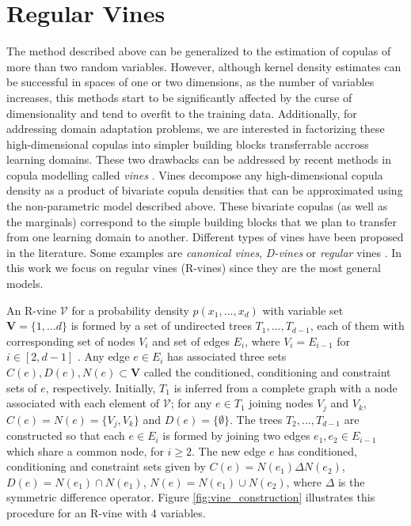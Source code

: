 \documentclass{article}
\begin{document}
\section{Regular Vines}\label{sec:vines}

The method described above can be generalized to the estimation of copulas of
more than two random variables.  However, although kernel density estimates can
be successful in spaces of one or two dimensions, as the number of variables
increases, this methods start to be significantly affected by the curse of
dimensionality and tend to overfit to the training data. Additionally, for
addressing domain adaptation problems, we are interested in factorizing these
high-dimensional copulas into simpler building blocks transferrable accross
learning domains.  These two drawbacks can be addressed by recent methods in
copula modelling called \emph{vines} \cite{vines}. Vines decompose any
high-dimensional copula density as a product of bivariate copula densities that
can be approximated using the non-parametric model described above.  These
bivariate copulas (as well as the marginals) correspond to the simple building
blocks that we plan to transfer from one learning domain to another.  Different
types of vines have been proposed in the literature.  Some examples are
\emph{canonical vines}, \emph{D-vines} or \emph{regular} vines
\cite{kurowicka,vines}. In this work we focus on regular vines (R-vines) since
they are the most general models.

An R-vine $\mathcal{V}$ for a probability density $p(x_1,\ldots,x_d)$ with
variable set $\mathbf{V} = \{1, \ldots d \}$ is formed by a set of undirected
trees $T_1, \ldots, T_{d-1}$, each of them with corresponding set of nodes
$V_i$ and set of edges $E_i$, where $V_i = E_{i-1}$ for $i \in [2, d-1]$ . Any
edge $e\in E_i$ has associated three sets $C(e),D(e),N(e)\subset\mathbf{V}$
called the conditioned, conditioning and constraint sets of $e$, respectively.
Initially, $T_1$ is inferred from a complete graph with a node associated with
each element of $\mathcal{V}$; for any $e \in T_1$ joining nodes $V_j$ and
$V_k$, $C(e) = N(e) = \{V_j,V_k\} $ and $D(e) = \{ \emptyset \}$.  The trees
$T_2,...,T_{d-1}$ are constructed so that each $e \in E_{i}$ is formed by
joining two edges $e_1, e_2 \in E_{i-1}$ which share a common node, for
$i\geq2$.  The new edge $e$ has conditioned, conditioning and constraint sets
given by $C(e) = N(e_1) \Delta N(e_2)$, $D(e)= N(e_1) \cap N(e_1)$, $N(e) =
N(e_1)\cup N(e_2)$, where $\Delta$ is the symmetric difference operator.
Figure \ref{fig:vine_construction} illustrates this procedure for an R-vine
with 4 variables.
\end{document}
